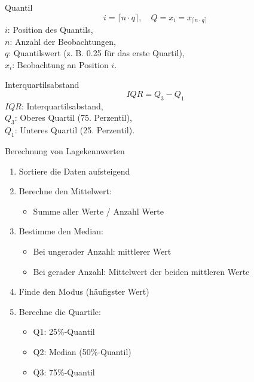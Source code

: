 \begin{minipage}{0.5\columnwidth}
\begin{definition}{Quantil}
$$
i=\lceil n \cdot q\rceil, \quad Q=x_{i}=x_{\lceil n \cdot q\rceil}
$$
$i$: Position des Quantils, \\
$n$: Anzahl der Beobachtungen, \\
$q$: Quantilswert (z. B. 0.25 für das erste Quartil), \\
$x_{i}$: Beobachtung an Position $i$.
\end{definition}
\end{minipage}
\begin{minipage}{0.5\columnwidth}
\begin{definition}{Interquartilsabstand}
$$
I Q R=Q_{3}-Q_{1}
$$
$IQR$: Interquartilsabstand, \\
$Q_{3}$: Oberes Quartil (75. Perzentil), \\
$Q_{1}$: Unteres Quartil (25. Perzentil).
\end{definition}
\end{minipage}

\begin{KR}{Berechnung von Lagekennwerten}
\begin{enumerate}
    \item Sortiere die Daten aufsteigend
    \item Berechne den Mittelwert:
        \begin{itemize}
            \item Summe aller Werte / Anzahl Werte
        \end{itemize}
    \item Bestimme den Median:
        \begin{itemize}
            \item Bei ungerader Anzahl: mittlerer Wert
            \item Bei gerader Anzahl: Mittelwert der beiden mittleren Werte
        \end{itemize}
    \item Finde den Modus (häufigster Wert)
    \item Berechne die Quartile:
        \begin{itemize}
            \item Q1: 25\%-Quantil
            \item Q2: Median (50\%-Quantil)
            \item Q3: 75\%-Quantil
        \end{itemize}
\end{enumerate}
\end{KR}

